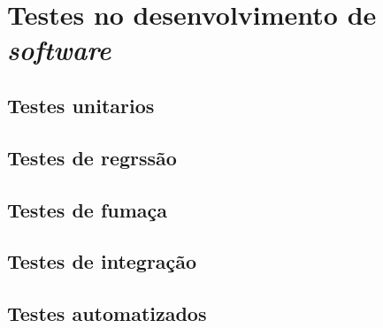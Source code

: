  \chapter{Testes no desenvolvimento de \textit{software}}

    \section{Testes unitarios}

    \section{Testes de regrssão}

    \section{Testes de fumaça}

    \section{Testes de integração}

    \section{Testes automatizados}
